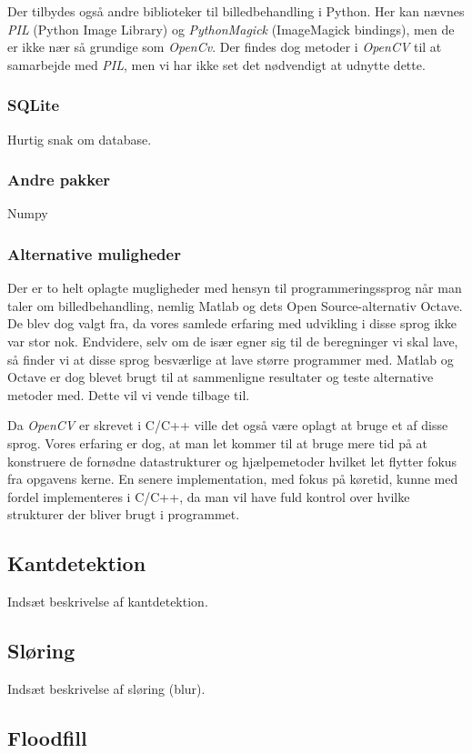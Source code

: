 {Der tilbydes også andre biblioteker til billedbehandling i Python. Her
kan nævnes \emph{PIL} (Python Image Library) og \emph{PythonMagick}
(ImageMagick bindings), men de er ikke nær så grundige som
\emph{OpenCv}. Der findes dog metoder i \emph{OpenCV} til at samarbejde
med \emph{PIL}, men vi har ikke set det nødvendigt at udnytte dette.

\subsubsection*{SQLite}
Hurtig snak om database.

\subsubsection*{Andre pakker}
Numpy

\subsubsection{Alternative muligheder}
Der er to helt oplagte mugligheder med hensyn til programmeringssprog
når man taler om billedbehandling, nemlig Matlab og dets Open
Source-alternativ Octave. De blev dog valgt fra, da vores samlede
erfaring med udvikling i disse sprog ikke var stor nok. Endvidere, selv
om de især egner sig til de beregninger vi skal lave, så finder vi at
disse sprog besværlige at lave større programmer med. Matlab og Octave
er dog blevet brugt til at sammenligne resultater og teste alternative
metoder med. Dette vil vi vende tilbage til.

Da \emph{OpenCV} er skrevet i C/C++ ville det også være oplagt at bruge et af
disse sprog. Vores erfaring er dog, at man let kommer til at bruge mere
tid på at konstruere de fornødne datastrukturer og hjælpemetoder hvilket
let flytter fokus fra opgavens kerne. En senere implementation, med
fokus på køretid, kunne med fordel implementeres i C/C++, da man vil
have fuld kontrol over hvilke strukturer der bliver brugt i programmet.

\subsection{Kantdetektion}
Indsæt beskrivelse af kantdetektion.

\subsection{Sløring}
Indsæt beskrivelse af sløring (blur).

\subsection{Floodfill}


}

